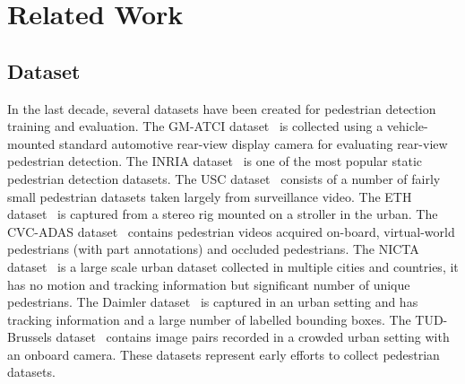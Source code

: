 \documentclass[journal]{IEEEtran}
\begin{document}
\section{Related Work} \label{2}
\subsection{Dataset}

In the last decade, several datasets have been created for pedestrian detection training and evaluation. The GM-ATCI dataset~\cite{DBLP:conf/ivs/SilbersteinLKG14} is collected using a vehicle-mounted standard automotive rear-view display camera for evaluating rear-view pedestrian detection. The INRIA dataset~\cite{DBLP:conf/cvpr/DalalT05} is one of the most popular static pedestrian detection datasets. The USC dataset~\cite{DBLP:conf/iccv/WuN07} consists of a number of fairly small pedestrian datasets taken largely from surveillance video. The ETH dataset~\cite{DBLP:conf/iccv/EssLG07} is captured from a stereo rig mounted on a stroller in the urban. The CVC-ADAS dataset~\cite{geronimo2007adaptive} contains pedestrian videos acquired on-board, virtual-world pedestrians (with part annotations) and occluded pedestrians. The NICTA dataset~\cite{overett2008new} is a large scale urban dataset collected in multiple cities and countries, it has no motion and tracking information but significant number of unique pedestrians. The Daimler dataset~\cite{DBLP:journals/pami/EnzweilerG09} is captured in an urban setting and has tracking information and a large number of labelled bounding boxes. The TUD-Brussels dataset~\cite{DBLP:conf/cvpr/WojekWS09} contains image pairs recorded in a crowded urban setting with an onboard camera. These datasets represent early efforts to collect pedestrian datasets.
\end{document}
